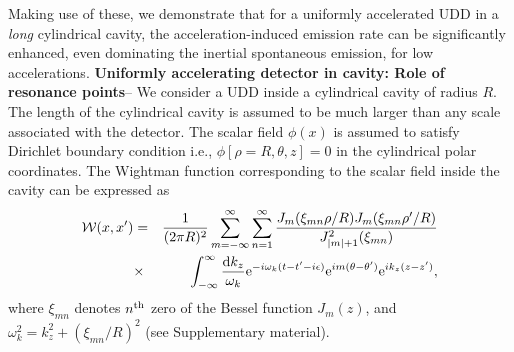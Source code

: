 \documentclass[aps,prl,nofootinbib,preprintnumbers,floatfix,twocolumn,superscriptaddress]{revtex4}
\def\nn{\nonumber}
\def\nn{\nonumber}
\def\d{{\rm d}}
\def\f{\frac}
\def\e{{\rm e}}
\begin{document}
Making use of these, we demonstrate that for a uniformly accelerated UDD 
in a {\it long} cylindrical cavity, the acceleration-induced 
emission rate can be significantly enhanced, even dominating the inertial spontaneous 
emission, for low accelerations. 
\vskip 5pt
\noindent
{\bf Uniformly accelerating detector in cavity: Role of resonance points}-- 
We consider a UDD inside a cylindrical cavity of radius $R$. The 
length of the cylindrical 
cavity is assumed to be much larger than any scale associated with the detector. 
The scalar field $\phi(x)$ is assumed to satisfy 
Dirichlet boundary condition i.e., $\phi[\rho=R,\theta,z]=0$ in the cylindrical 
polar coordinates. The Wightman
function corresponding to the scalar field inside the cavity can be expressed as 
 \begin{eqnarray}
 \label{eqn:Wightman}
 {\cal W}(x,x')&=&\f{1}{(2\pi R)^2}
 \sum_{m=-\infty}^{\infty} \sum_{n=1}^{\infty}
 \f{J_{m}(\xi_{mn} \rho/R)J_{m}(\xi_{mn} \rho'/R)}{J^2_{|m|+1}(\xi_{mn})} \nn \\
 &\times&\int_{-\infty}^{\infty} \f{\d k_z}{\omega_k}
 \e^{-i\omega_k (t-t'-i\epsilon)} \e^{im(\theta-\theta')} \e^{ik_z(z-z')},
\end{eqnarray}
where $\xi_{mn}$ denotes $n^{{\rm th}}$ zero of the Bessel function $J_m(z)$, 
and $\omega_{k}^2=k_{z}^2+(\xi_{mn}/R)^2$ (see Supplementary material).
\end{document}
